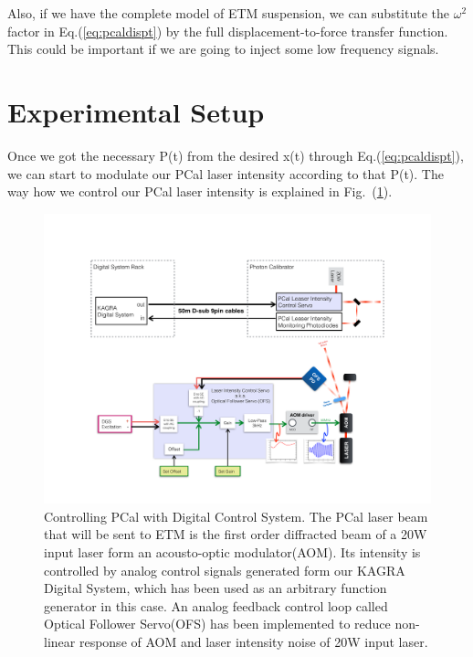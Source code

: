 Also, if we have the complete model of ETM suspension, we can substitute the $\omega^2$ factor in Eq.(\ref{eq:pcaldispt}) by the full displacement-to-force transfer function. This could be important if we are going to inject some low frequency signals.


\pagebreak
\section{Experimental Setup}

Once we got the necessary P(t) from the desired x(t) through Eq.(\ref{eq:pcaldispt}), we can start to modulate our PCal laser intensity according to that P(t). The way how we control our PCal laser intensity is explained in Fig.~(\ref{fig:injsigpath}).


\begin{figure}[hbt!]
\centering
\includegraphics[width=1\textwidth]{figure/injsigpath}
\caption[Controlling PCal with Digital Control System]{Controlling PCal with Digital Control System. The PCal laser beam that will be sent to ETM is the first order diffracted beam of a 20W input laser form an acousto-optic modulator(AOM). Its intensity is controlled by analog control signals generated form our KAGRA Digital System, which has been used as an arbitrary function generator in this case. An analog feedback control loop called Optical Follower Servo(OFS) has been implemented to reduce non-linear response of AOM and laser intensity noise of 20W input laser.  }
\label{fig:injsigpath}
\end{figure}


